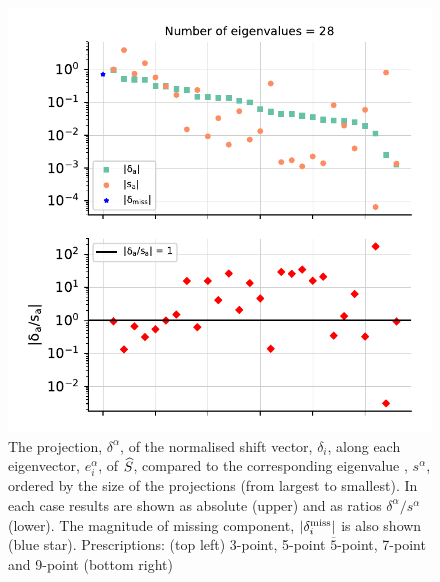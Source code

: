 \begin{figure}[H]
\begin{center}
    \includegraphics[scale=0.55]{mhous/plots/projector_eigenvalue_ratio_9pt_global.pdf}
    \caption{\small The projection, $\delta^\alpha$, of the normalised shift vector,
      $\delta_i$, along each eigenvector, $e^\alpha_i$, of $\widehat{S}$, compared to the corresponding eigenvalue ,
    $s^\alpha$, ordered
      by the size of the projections (from largest to
      smallest). In each case results are shown as absolute (upper) and
      as ratios $\delta^\alpha/s^\alpha$ (lower). The magnitude of missing component, $|\delta^{\rm miss}_i|$ is also shown (blue star).
      Prescriptions: (top left) 3-point, 5-point
      $\overline{5}$-point, 7-point and 9-point (bottom right)}
        \label{fig:evals_all_prescriptions}
  \end{center}
\end{figure}
